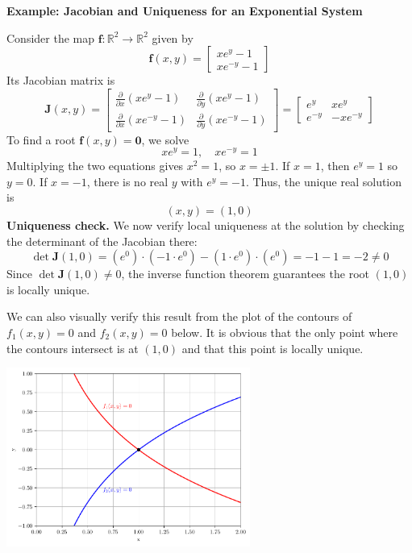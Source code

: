 \begin{exampleBox}
    \textbf{Example: Jacobian and Uniqueness for an Exponential System}
    
    Consider the map $\mathbf{f}:\mathbb{R}^2\to\mathbb{R}^2$ given by
    \[
    \mathbf{f}(x,y)
    = \begin{bmatrix}
    x e^y - 1 \\[6pt]
    x e^{-y} - 1
    \end{bmatrix}
    \]
    Its Jacobian matrix is
    \[
    \mathbf{J}(x,y)
    = \begin{bmatrix}
    \frac{\partial}{\partial x}(x e^y - 1) & \frac{\partial}{\partial y}(x e^y - 1) \\[6pt]
    \frac{\partial}{\partial x}(x e^{-y} - 1) & \frac{\partial}{\partial y}(x e^{-y} - 1)
    \end{bmatrix}
    = \begin{bmatrix}
    e^y      & x e^y \\[4pt]
    e^{-y}   & -x e^{-y}
    \end{bmatrix}
    \]
    To find a root $\mathbf{f}(x,y)=\mathbf{0}$, we solve
    \[
    x e^y = 1,
    \quad
    x e^{-y} = 1
    \]
    Multiplying the two equations gives $x^2=1$, so $x=\pm1$.  If $x=1$, then $e^y=1$ so $y=0$.  If $x=-1$, there is no real $y$ with $e^y=-1$.  Thus, the unique real solution is
    \[
    (x,y) = (1,0)
    \]
    \textbf{Uniqueness check.}  We now verify local uniqueness at the solution by checking the determinant of the Jacobian there:
    \[
    \det \mathbf{J}(1,0)
    = \left(e^0\right)\cdot\left(-1\cdot e^0\right)
    - \left(1\cdot e^0\right)\cdot\left(e^0\right)
    = -1 - 1
    = -2 \neq 0
    \]  
    Since $\det\mathbf{J}(1,0)\neq0$, the inverse function theorem guarantees the root $(1,0)$ is locally unique.

    We can also visually verify this result from the plot of the contours of $f_1(x,y)=0$ and $f_2(x,y)=0$ below. It is obvious that the only point where the contours intersect is at $(1,0)$ and that this point is locally unique.
    \begin{center}
    \includegraphics[width=0.6\textwidth]{figs/nle/exponential_example.pdf}
    \end{center}
\end{exampleBox}


